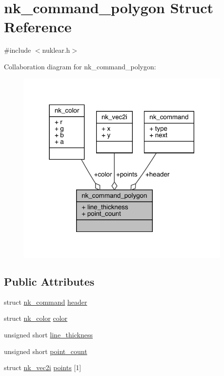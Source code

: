 \hypertarget{structnk__command__polygon}{}\section{nk\+\_\+command\+\_\+polygon Struct Reference}
\label{structnk__command__polygon}


{\ttfamily \#include $<$nuklear.\+h$>$}



Collaboration diagram for nk\+\_\+command\+\_\+polygon\+:
\nopagebreak
\begin{figure}[H]
\begin{center}
\leavevmode
\includegraphics[width=302pt]{structnk__command__polygon__coll__graph}
\end{center}
\end{figure}
\subsection*{Public Attributes}
\begin{DoxyCompactItemize}
\item 
struct \mbox{\hyperlink{structnk__command}{nk\+\_\+command}} \mbox{\hyperlink{structnk__command__polygon_a62fcb322cddbbc496b698ac0fe70e811}{header}}
\item 
struct \mbox{\hyperlink{structnk__color}{nk\+\_\+color}} \mbox{\hyperlink{structnk__command__polygon_ab7b7b39934676870924a6793dc2dc00f}{color}}
\item 
unsigned short \mbox{\hyperlink{structnk__command__polygon_a866c970775ae0a05527d80878f597245}{line\+\_\+thickness}}
\item 
unsigned short \mbox{\hyperlink{structnk__command__polygon_aae8b227a3aaec19baf32f06b28449728}{point\+\_\+count}}
\item 
struct \mbox{\hyperlink{structnk__vec2i}{nk\+\_\+vec2i}} \mbox{\hyperlink{structnk__command__polygon_ae28ff35fae64f9f3977d0402121db223}{points}} \mbox{[}1\mbox{]}
\end{DoxyCompactItemize}


